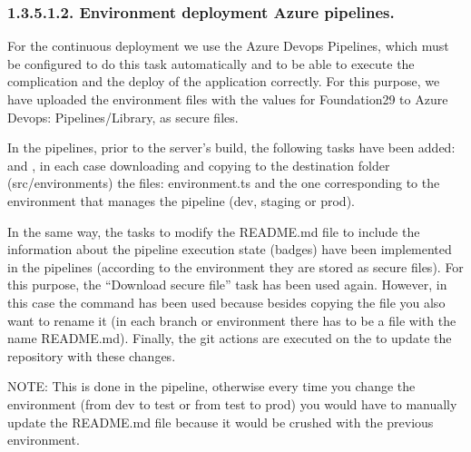 \documentclass[letterpaper,10pt,english]{sphinxmanual}
\begin{document}
\subsubsection{1.3.5.1.2. Environment deployment \textendash{} Azure pipelines.}
\label{\detokenize{pages/Environments/Build_deploy:environment-deployment-azure-pipelines}}
For the continuous deployment we use the Azure Devops Pipelines, which must be configured to do this task automatically and to be able to execute the complication and the deploy of the application correctly.
For this purpose, we have uploaded the environment files with the values for Foundation29 to Azure Devops: Pipelines/Library, as secure files.

In the pipelines, prior to the server’s build, the following tasks have been added:  and , in each case downloading and copying to the destination folder (src/environments) the files: environment.ts and the one corresponding to the environment that manages the pipeline (dev, staging or prod).

In the same way, the tasks to modify the README.md file to include the information about the pipeline execution state (badges) have been implemented in the pipelines (according to the environment they are stored as secure files). For this purpose, the “Download secure file” task has been used again. However, in this case the   command has been used because besides copying the file you also want to rename it (in each branch or environment there has to be a file with the name README.md). Finally, the git actions are executed on the  to update the repository with these changes.

NOTE: This is done in the pipeline, otherwise every time you change the environment (from dev to test or from test to prod) you would have to manually update the README.md file because it would be crushed with the previous environment.
\end{document}
